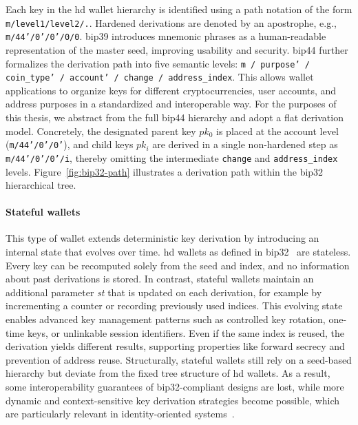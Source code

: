 Each key in the \acrshort{hd} wallet hierarchy is identified using a path notation of the form \texttt{m/level1/level2/.}. Hardened derivations are denoted by an apostrophe, e.g., \texttt{m/44'/0'/0'/0/0}. \acrshort{bip39} introduces mnemonic phrases as a human-readable representation of the master seed, improving usability and security. \acrshort{bip44} further formalizes the derivation path into five semantic levels: \texttt{m / purpose' / coin\_type' / account' / change / address\_index}. This allows wallet applications to organize keys for different cryptocurrencies, user accounts, and address purposes in a standardized and interoperable way. For the purposes of this thesis, we abstract from the full \acrshort{bip44} hierarchy and adopt a flat derivation model. Concretely, the designated parent key $pk_0$ is placed at the account level (\texttt{m/44'/0'/0'}), and child keys $pk_i$ are derived in a single non-hardened step as \texttt{m/44'/0'/0'/i}, thereby omitting the intermediate \texttt{change} and \texttt{address\_index} levels. Figure~\ref{fig:bip32-path} illustrates a derivation path within the \acrshort{bip32} hierarchical tree.

\BIPWalletFigure

\paragraph{Stateful wallets}
This type of wallet extends deterministic key derivation by introducing an internal state that evolves over time. \acrshort{hd} wallets as defined in \acrshort{bip32}~\cite{bip32} are stateless. Every key can be recomputed solely from the seed and index, and no information about past derivations is stored. In contrast, stateful wallets maintain an additional parameter \emph{st} that is updated on each derivation, for example by incrementing a counter or recording previously used indices. This evolving state enables advanced key management patterns such as controlled key rotation, one-time keys, or unlinkable session identifiers. Even if the same index is reused, the derivation yields different results, supporting properties like forward secrecy and prevention of address reuse. Structurally, stateful wallets still rely on a seed-based hierarchy but deviate from the fixed tree structure of \acrshort{hd} wallets. As a result, some interoperability guarantees of \acrshort{bip32}-compliant designs are lost, while more dynamic and context-sensitive key derivation strategies become possible, which are particularly relevant in identity-oriented systems~\cite{Das2021,erinle2025sokdesignvulnerabilitiessecurity}.
